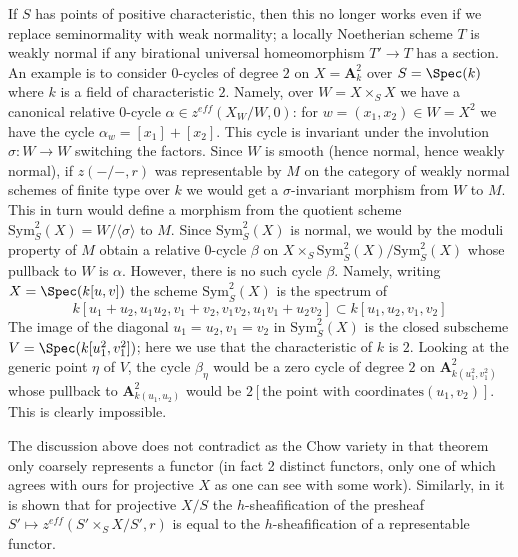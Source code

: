 \begin{remark}
\medskip\noindent
If $S$ has points of positive characteristic, then this no longer works
even if we replace seminormality with weak normality; a locally Noetherian
scheme $T$ is weakly normal if any birational universal homeomorphism
$T' \to T$ has a section. An example is to consider $0$-cycles of degree
$2$ on $X = \mathbf{A}^2_k$ over $S = \Spec(k)$ where $k$ is a field of
characteristic $2$. Namely, over $W = X \times_S X$ we have a canonical
relative $0$-cycle $\alpha \in z^{eff}(X_W/W, 0)$: for
$w = (x_1, x_2) \in W = X^2$ we have the cycle $\alpha_w = [x_1] + [x_2]$.
This cycle is invariant under the involution $\sigma : W \to W$ switching
the factors. Since $W$ is smooth (hence normal, hence weakly normal), if
$z(-/-, r)$ was representable by $M$ on the category of weakly normal
schemes of finite type over $k$ we would get a $\sigma$-invariant
morphism from $W$ to $M$. This in turn would define a morphism from the
quotient scheme $\text{Sym}^2_S(X) = W/\langle \sigma \rangle$ to $M$.
Since $\text{Sym}^2_S(X)$ is normal, we would by the moduli property of $M$
obtain a relative $0$-cycle $\beta$ on
$X \times_S \text{Sym}^2_S(X) / \text{Sym}^2_S(X)$
whose pullback to $W$ is $\alpha$. However, there is no such cycle $\beta$.
Namely, writing $X = \Spec(k[u, v])$ the scheme
$\text{Sym}^2_S(X)$ is the spectrum of
$$
k[u_1 + u_2, u_1u_2, v_1 + v_2, v_1v_2, u_1v_1 + u_2v_2]
\subset
k[u_1, u_2, v_1, v_2]
$$
The image of the diagonal $u_1 = u_2, v_1 = v_2$ in $\text{Sym}^2_S(X)$
is the closed subscheme $V = \Spec(k[u_1^2, v_1^2])$; here we use that
the characteristic of $k$ is $2$. Looking at the
generic point $\eta$ of $V$, the cycle $\beta_\eta$ would be a zero
cycle of degree $2$ on $\mathbf{A}^2_{k(u_1^2, v_1^2)}$
whose pullback to $\mathbf{A}^2_{k(u_1, u_2)}$ would be
$2[\text{the point with coordinates} (u_1, v_2)]$.
This is clearly impossible.

\medskip\noindent
The discussion above does not contradict \cite[Theorem 4.13]{KRC} as the Chow
variety in that theorem only coarsely represents a functor (in fact 2
distinct functors, only one of which agrees with ours for projective $X$
as one can see with some work). Similarly, in \cite[Section 4.4]{SV}
it is shown that for projective $X/S$ the $h$-sheafification of the presheaf
$S' \mapsto z^{eff}(S' \times_S X/S', r)$ is equal to the $h$-sheafification of
a representable functor.
\end{remark}

